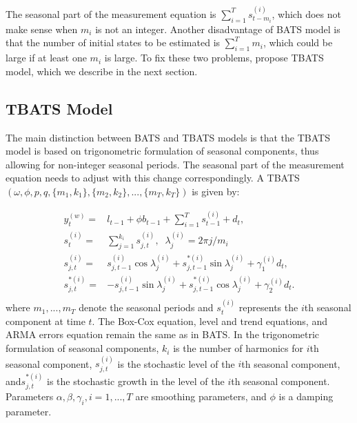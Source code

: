 \documentclass{uwstat572}
\begin{document}
The seasonal part of the measurement equation is $\sum\limits_{i=1}^T s_{t-m_i}^{(i)}$, which does not make sense when $m_i$ is not an integer. Another disadvantage of BATS model is that the number of initial states to be estimated is $\sum\limits_{i=1}^T m_i$, which could be large if at least one $m_i$ is large. To fix these two problems, \citet{de2011forecasting} propose TBATS model, which we describe in the next section.  

\subsection{TBATS Model}
\hspace{4ex}The main distinction between BATS and TBATS models is that the TBATS model is based on trigonometric formulation of seasonal components, thus allowing for non-integer seasonal periods. The seasonal part of the measurement equation needs to adjust with this change correspondingly. A TBATS $(\omega, \phi, p, q, \{m_1,k_1\}, \{m_2,k_2\},...,\{m_T,k_T\} )$ is given by:

\begin{subequations}
\begin{align}
y_t^{  (w)}=&l_{t-1}+\phi b_{t-1} +\sum\limits_{i=1}^T s_{t-1}^{(i)}+d_t, \\
s_t^{(i)}=&\sum\limits_{j=1}^{k_i} s_{j,t}^{(i)},\;\;  \lambda_{j}^{(i)}=2\pi j /m_i \\
s_{j,t}^{(i)}=&s_{j,t-1}^{(i)} \cos \lambda_j^{(i)} + s_{j,t-1}^{*(i)} \sin \lambda_j^{(i)} +\gamma_1^{(i)}d_t, \\
s_{j,t}^{*(i)}=&-s_{j,t-1}^{(i)} \sin \lambda_j^{(i)} + s_{j,t-1}^{*(i)} \cos \lambda_j^{(i)} +\gamma_2^{(i)}d_t. \\
\end{align}
\end{subequations}
\noindent where $m_1,..., m_T$ denote the seasonal periods and $s_t^{(i)}$ represents the $i$th seasonal component at time $t$. The Box-Cox equation, level and trend equations, and ARMA errors equation remain the same as in BATS. In the trigonometric formulation of seasonal components, $k_i$ is the number of harmonics for $i$th seasonal component, $s_{j,t}^{(i)}$ is the stochastic level of the $i$th seasonal component, and$s_{j,t}^{*(i)}$ is the stochastic growth in the level of the $i$th seasonal component. Parameters $\alpha, \beta, \gamma_i, i=1,...,T$ are smoothing parameters, and $\phi$ is a damping parameter. 
\end{document}
